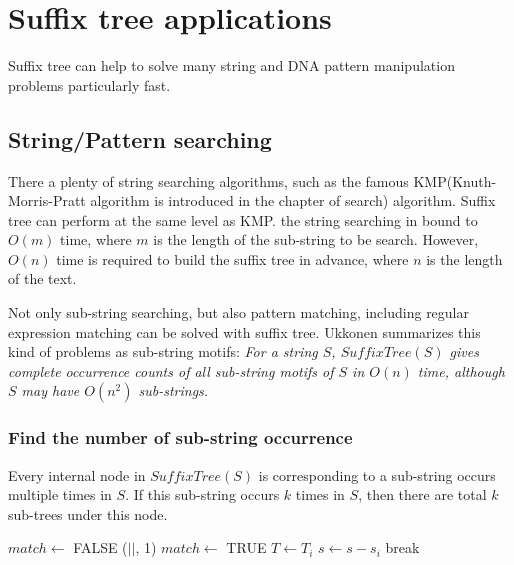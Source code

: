 \documentclass{article}
\begin{document}
\section{Suffix tree applications}

Suffix tree can help to solve many string and DNA pattern manipulation problems
particularly fast.

\subsection{String/Pattern searching}
\label{substring-lookup}

There a plenty of string searching algorithms, such as the
famous KMP(Knuth-Morris-Pratt algorithm is introduced in the chapter of search)
algorithm. Suffix tree can perform at the same level as
KMP\cite{zhang-shaojie-lec}. the string searching in bound to $O(m)$ time,
where $m$ is the length of the sub-string to be search. However, $O(n)$ time is
required to build the suffix tree in advance, where $n$ is the length
of the text\cite{lallison-stree}.

Not only sub-string searching, but also pattern matching, including
regular expression matching can be solved with suffix tree. Ukkonen
summarizes this kind of problems as sub-string motifs:
{\em For a string $S$, $SuffixTree(S)$ gives complete occurrence
counts of all sub-string motifs of $S$ in $O(n)$ time, although $S$ may have
$O(n^2)$ sub-strings.}

\subsubsection{Find the number of sub-string occurrence}

Every internal node in $SuffixTree(S)$ is corresponding
to a sub-string occurs multiple times in $S$. If this sub-string occurs
$k$ times in $S$, then there are total $k$ sub-trees under this node\cite{ukkonen-lec}.

\begin{algorithmic}[1]
  \Loop
    \State $match \gets$ FALSE
        \State \Return {}($|$$|$, 1)
        \State $match \gets$ TRUE
        \State $T \gets T_i$
        \State $s \gets s - s_i$
        \State break
      \EndIf
    \EndFor
      \State {}
    \EndIf
  \EndLoop
\EndFunction
\end{algorithmic}
\end{document}
